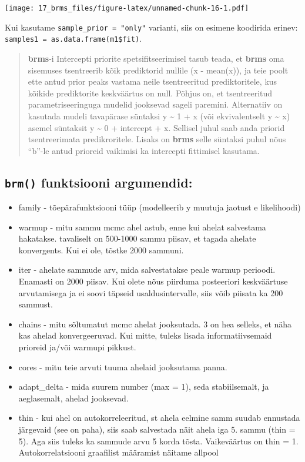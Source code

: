 \documentclass[]{book}
\begin{document}
\texttt{[image: 17\_brms\_files/figure-latex/unnamed-chunk-16-1.pdf]}

Kui kasutame \texttt{sample\_prior\ =\ "only"} varianti, siis on esimene koodirida erinev: \texttt{samples1\ =\ as.data.frame(m1\$fit)}.

\begin{quote}
\textbf{brms}-i Intercepti priorite spetsifitseerimisel tasub teada, et \textbf{brms} oma sisemuses tsentreerib kõik prediktorid nullile (x - mean(x)), ja teie poolt ette antud prior peaks vastama neile tsentreeritud prediktoritele, kus kõikide prediktorite keskväärtus on null. Põhjus on, et tsentreeritud parametriseeringuga mudelid jooksevad sageli paremini. Alternatiiv on kasutada mudeli tavapärase süntaksi y \textasciitilde{} 1 + x (või ekvivalentselt y \textasciitilde{} x) asemel süntaksit y \textasciitilde{} 0 + intercept + x. Sellisel juhul saab anda priorid tsentreerimata predikroritele. Lisaks on \textbf{brms} selle süntaksi puhul nõus ``b''-le antud prioreid vaikimisi ka intercepti fittimisel kasutama.
\end{quote}

\hypertarget{brm-funktsiooni-argumendid}{%
\subsection{\texorpdfstring{\texttt{brm()} funktsiooni argumendid:}{brm() funktsiooni argumendid:}}\label{brm-funktsiooni-argumendid}}

\begin{itemize}
\item
  family - tõepärafunktsiooni tüüp (modelleerib y muutuja jaotust e likelihoodi)
\item
  warmup - mitu sammu mcmc ahel astub, enne kui ahelat salvestama hakatakse. tavaliselt on 500-1000 sammu piisav, et tagada ahelate konvergents. Kui ei ole, tõstke 2000 sammuni.
\item
  iter - ahelate sammude arv, mida salvestatakse peale warmup perioodi. Enamasti on 2000 piisav. Kui olete nõus piirduma posteeriori keskväärtuse arvutamisega ja ei soovi täpseid usaldusintervalle, siis võib piisata ka 200 sammust.
\item
  chains - mitu sõltumatut mcmc ahelat jooksutada. 3 on hea selleks, et näha kas ahelad konvergeeruvad. Kui mitte, tuleks lisada informatiivsemaid prioreid ja/või warmupi pikkust.
\item
  cores - mitu teie arvuti tuuma ahelaid jooksutama panna.
\item
  adapt\_delta - mida suurem number (max = 1), seda stabiilsemalt, ja aeglasemalt, ahelad jooksevad.
\item
  thin - kui ahel on autokorreleeritud, st ahela eelmine samm suudab ennustada järgevaid (see on paha), siis saab salvestada näit ahela iga 5. sammu (thin = 5). Aga siis tuleks ka sammude arvu 5 korda tõsta. Vaikeväärtus on thin = 1. Autokorrelatsiooni graafilist määramist näitame allpool
\end{itemize}
\end{document}
